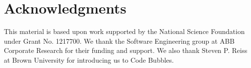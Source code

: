 \documentclass[conference]{IEEEtran}
\begin{document}
%




\section*{Acknowledgments}

This material is based upon work supported by the National Science Foundation under Grant No. 1217700. 
We thank the Software Engineering group at ABB Corporate Research for their funding and support.
We also thank Steven P. Reiss at Brown University for introducing us to Code Bubbles.










\end{document}
